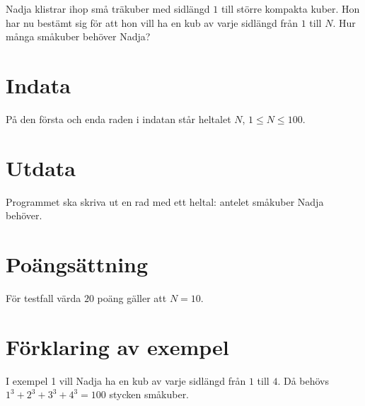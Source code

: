 %
Nadja klistrar ihop små träkuber med sidlängd $1$ till större kompakta kuber. Hon har nu bestämt sig för att hon vill ha en kub av varje sidlängd från $1$ till $N$. Hur många småkuber behöver Nadja?

\section*{Indata}
På den första och enda raden i indatan står heltalet $N$, $1 \leq N \leq 100$.

\section*{Utdata}
Programmet ska skriva ut en rad med ett heltal: antelet småkuber Nadja behöver.

\section*{Poängsättning}
För testfall värda $20$ poäng gäller att $N=10$.

\section*{Förklaring av exempel}
I exempel 1 vill Nadja ha en kub av varje sidlängd från $1$ till $4$.
Då behövs $1^3 + 2^3 + 3^3 + 4^3 = 100$ stycken småkuber.
